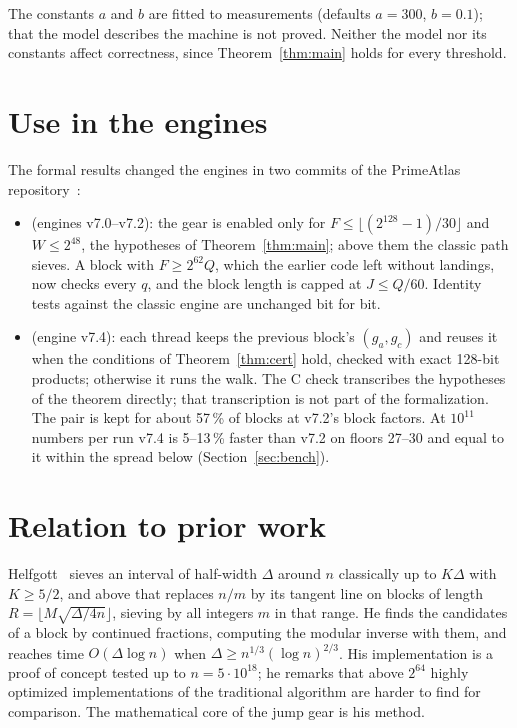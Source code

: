\documentclass[11pt]{amsart}
\newcommand{\lean}[1]{\texttt{\detokenize{#1}}}
\theoremstyle{definition}
\begin{document}
The constants $a$ and $b$ are fitted to measurements (defaults $a = 300$, $b = 0.1$); that
the model describes the machine is not proved. Neither the model nor its constants affect
correctness, since Theorem~\ref{thm:main} holds for every threshold.

\section{Use in the engines}\label{sec:engines}

The formal results changed the engines in two commits of the PrimeAtlas
repository~\cite{atlas}:
\begin{itemize}
  \item \lean{27fe0f5} (engines v7.0--v7.2): the gear is enabled only for
    $F \le \lfloor (2^{128}-1)/30 \rfloor$ and $W \le 2^{48}$, the hypotheses of
    Theorem~\ref{thm:main}; above them the classic path sieves. A block with
    $F \ge 2^{62}Q$, which the earlier code left without landings, now checks every $q$, and
    the block length is capped at $J \le Q/60$. Identity tests against the classic engine are
    unchanged bit for bit.
  \item \lean{ab4491b} (engine v7.4): each thread keeps the previous block's $(g_a, g_c)$ and
    reuses it when the conditions of Theorem~\ref{thm:cert} hold, checked with exact 128-bit
    products; otherwise it runs the walk. The C check transcribes the hypotheses of the
    theorem directly; that transcription is not part of the formalization. The pair is kept
    for about 57\,\% of blocks at v7.2's block factors. At $10^{11}$ numbers per run v7.4 is
    5--13\,\% faster than v7.2 on floors 27--30 and equal to it within the spread below
    (Section~\ref{sec:bench}).
\end{itemize}

\section{Relation to prior work}\label{sec:prior}

Helfgott~\cite{helfgott} sieves an interval of half-width $\Delta$ around $n$ classically up to
$K\Delta$ with $K \ge 5/2$, and above that replaces $n/m$ by its tangent line on blocks of
length $R = \lfloor M\sqrt{\Delta/4n}\rfloor$, sieving by all integers $m$ in that range. He
finds the candidates of a block by continued fractions, computing the modular inverse with
them, and reaches time $O(\Delta \log n)$ when $\Delta \ge n^{1/3}(\log n)^{2/3}$. His
implementation is a proof of concept tested up to $n = 5\cdot 10^{18}$; he remarks that above
$2^{64}$ highly optimized implementations of the traditional algorithm are harder to find for
comparison. The mathematical core of the jump gear is his method.
\end{document}
